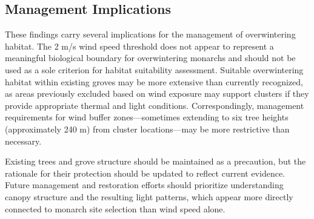 \subsection*{Management Implications}

These findings carry several implications for the management of overwintering habitat. The 2 m/s wind speed threshold does not appear to represent a meaningful biological boundary for overwintering monarchs and should not be used as a sole criterion for habitat suitability assessment. Suitable overwintering habitat within existing groves may be more extensive than currently recognized, as areas previously excluded based on wind exposure may support clusters if they provide appropriate thermal and light conditions. Correspondingly, management requirements for wind buffer zones---sometimes extending to six tree heights (approximately 240 m) from cluster locations---may be more restrictive than necessary.

Existing trees and grove structure should be maintained as a precaution, but the rationale for their protection should be updated to reflect current evidence. Future management and restoration efforts should prioritize understanding canopy structure and the resulting light patterns, which appear more directly connected to monarch site selection than wind speed alone.
